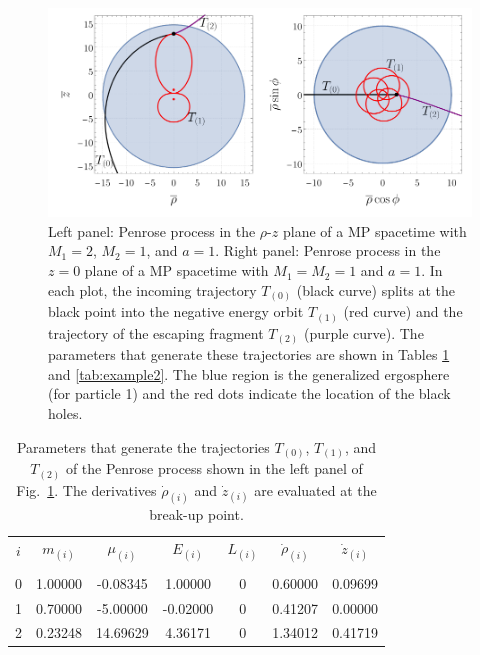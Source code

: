 \begin{figure}[!ht]
  \centering
  \includegraphics[width=\linewidth]{img/penrose_binaries/fig6.pdf}
  \caption{Left panel: Penrose process in the $\rho$-$z$ plane of a MP spacetime with $M_1=2$, $M_2=1$, and $a=1$. Right panel: Penrose process in the $z=0$ plane of a MP spacetime with $M_1=M_2=1$ and $a=1$. In each plot, the incoming trajectory $T_{(0)}$ (black curve) splits at the black point into the negative energy orbit $T_{(1)}$ (red curve) and the trajectory of the escaping fragment $T_{(2)}$ (purple curve). The parameters that generate these trajectories are shown in Tables \ref{tab:example1} and \ref{tab:example2}. The blue region is the generalized ergosphere (for particle 1) and the red dots indicate the location of the black holes.}
  \label{fig:example1}
\end{figure}

\begin{table}[h]
  \centering
  \begin{tabular}{ccccccc}
    \hline\hline
    $i$ & $m_{(i)}$ & $\mu_{(i)}$ & $E_{(i)}$ & $L_{(i)}$ & $\dot{\rho}_{(i)}$ & $\dot{z}_{(i)}$ \\ \vspace{-0.3cm} \\
    0   & 1.00000   & -0.08345    & 1.00000   & 0         & 0.60000            & 0.09699         \\
    1   & 0.70000   & -5.00000    & -0.02000  & 0         & 0.41207            & 0.00000         \\
    2   & 0.23248   & 14.69629    & 4.36171   & 0         & 1.34012            & 0.41719         \\
    \hline\hline
  \end{tabular}
  \caption{Parameters that generate the trajectories $T_{(0)}$, $T_{(1)}$, and $T_{(2)}$ of the Penrose process shown in the left panel of Fig.~\ref{fig:example1}. The derivatives $\dot{\rho}_{(i)}$ and $\dot{z}_{(i)}$ are evaluated at the break-up point.}
  \label{tab:example1}
\end{table}

